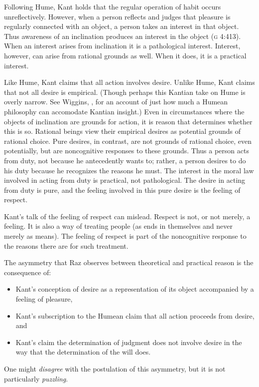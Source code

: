 \documentclass[a4paper,12pt]{article}
\begin{document}
Following Hume, Kant holds that the regular operation of habit occurs unreflectively. However, when a person reflects and judges that pleasure is regularly connected with an object, a person takes an interest in that object. Thus awareness of an inclination produces an interest in the object (\textsc{g} 4:413). When an interest arises from inclination it is a pathological interest. Interest, however, can arise from rational grounds as well. When it does, it is a practical interest.

Like Hume, Kant claims that all action involves desire. Unlike Hume, Kant claims that not all desire is empirical. (Though perhaps this Kantian take on Hume is overly narrow. See Wiggins, \citeyear{Wiggins:1995fk}, for an account of just how much a Humean philosophy can accomodate Kantian insight.) Even in circumstances where the objects of inclination are grounds for action, it is reason that determines whether this is so. Rational beings view their empirical desires as potential grounds of rational choice. Pure desires, in contrast, are not grounds of rational choice, even potentially, but are noncognitive responses to these grounds. Thus a person acts from duty, not because he antecedently wants to; rather, a person desires to do his duty because he recognizes the reasons he must. The interest in the moral law involved in acting from duty is practical, not pathological. The desire in acting from duty is pure, and the feeling involved in this pure desire is the feeling of respect.

Kant's talk of the feeling of respect can mislead. Respect is not, or not merely, a feeling. It is also a way of treating people (as ends in themselves and never merely as means). The feeling of respect is part of the noncognitive response to the reasons there are for such treatment.

The asymmetry that Raz observes between theoretical and practical reason is the consequence of: 
\begin{itemize}
	\item Kant's conception of desire as a representation of its object accompanied by a feeling of pleasure, 
	\item Kant's subscription to the Humean claim that all action proceeds from desire, and 
	\item Kant's claim the determination of judgment does not involve desire in the way that the determination of the will does. 
\end{itemize}
One might \emph{disagree} with the postulation of this asymmetry, but it is not particularly \emph{puzzling}.
\end{document}

